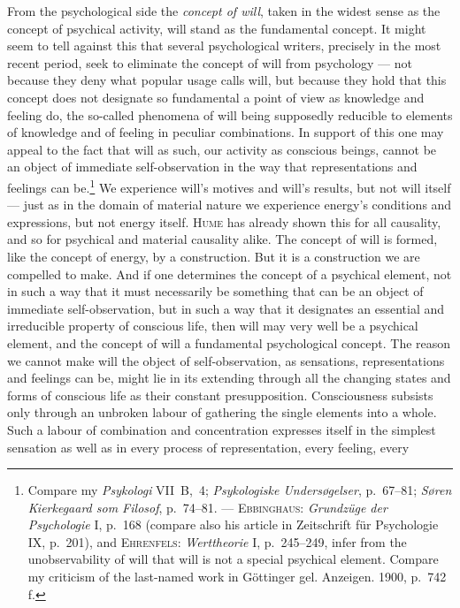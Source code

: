 \documentclass[12pt,a4paper]{book}
\newcommand{\opage}[1]{\marginnote{\footnotesize\textit{[#1]}}}
\begin{document}
From the psychological side the \emph{concept of will}, taken in the widest
sense as the concept of psychical activity, will stand as the fundamental
concept. It might seem to tell against this that several psychological writers,
precisely in the most recent period, seek to eliminate the concept of will from
psychology --- not because they deny what popular usage calls will, but because
they hold that this concept does not designate so fundamental a point of view as
knowledge and feeling do, the so-called phenomena of will being supposedly
reducible to elements of knowledge and of feeling in peculiar combinations. In
\opage{26}support of this one may appeal to the fact that will as such, our activity as
conscious beings, cannot be an object of immediate self-observation in the way
that representations and feelings can be.\footnote{Compare my \textit{Psykologi}
VII~B,~4; \textit{Psykologiske Undersøgelser}, p.~67--81; \textit{Søren
Kierkegaard som Filosof}, p.~74--81. --- \textsc{Ebbinghaus}: \textit{Grundzüge
der Psychologie} I, p.~168 (compare also his article in Zeitschrift für
Psychologie IX, p.~201), and \textsc{Ehrenfels}: \textit{Werttheorie} I,
p.~245--249, infer from the unobservability of will that will is not a special
psychical element. Compare my criticism of the last-named work in Göttinger gel.
Anzeigen. 1900, p.~742\,f.} We experience will's motives and will's results, but
not will itself --- just as in the domain of material nature we experience
energy's conditions and expressions, but not energy itself. \textsc{Hume} has
already shown this for all causality, and so for psychical and material
causality alike. The concept of will is formed, like the concept of energy, by a
construction. But it is a construction we are compelled to make. And if one
determines the concept of a psychical element, not in such a way that it must
necessarily be something that can be an object of immediate self-observation,
but in such a way that it designates an essential and irreducible property of
conscious life, then will may very well be a psychical element, and the concept
of will a fundamental psychological concept. The reason we cannot make will the
object of self-observation, as sensations, representations and feelings can be,
might lie in its extending through all the changing states and forms of
conscious life as their constant presupposition. Consciousness subsists only
through an unbroken labour of gathering the single elements into a whole. Such a
labour of combination and concentration expresses itself in the simplest
sensation as well as in every process of representation, every feeling, every
\end{document}

